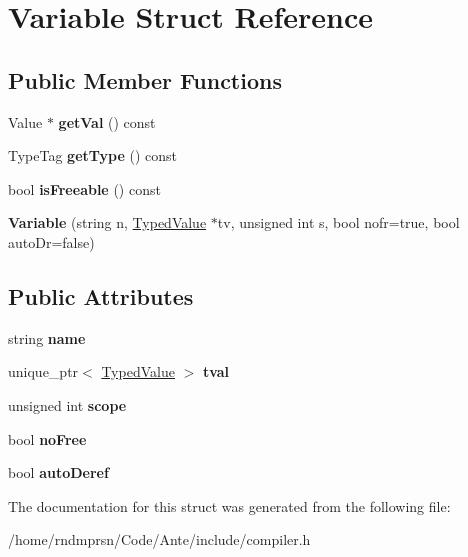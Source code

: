 \hypertarget{structVariable}{}\section{Variable Struct Reference}
\label{structVariable}
\subsection*{Public Member Functions}
\begin{DoxyCompactItemize}
\item 
\mbox{\label{structVariable_a164fedf4f2587fa45acca5bc2a8bad14}} 
Value $\ast$ {\bfseries get\+Val} () const
\item 
\mbox{\label{structVariable_a7dd2bdb587e4ea8f85d7c440592f7d5a}} 
Type\+Tag {\bfseries get\+Type} () const
\item 
\mbox{\label{structVariable_ac34f8cd9f40614d9ca9f7cfcabac1d45}} 
bool {\bfseries is\+Freeable} () const
\item 
\mbox{\label{structVariable_a5bc491642160a68df700245f37699544}} 
{\bfseries Variable} (string n, \hyperlink{structTypedValue}{Typed\+Value} $\ast$tv, unsigned int s, bool nofr=true, bool auto\+Dr=false)
\end{DoxyCompactItemize}
\subsection*{Public Attributes}
\begin{DoxyCompactItemize}
\item 
\mbox{\label{structVariable_a20d3268aae34f6b98d7dbdecb65b17ed}} 
string {\bfseries name}
\item 
\mbox{\label{structVariable_a9439f3ca39b88cd883c6edf022af2070}} 
unique\+\_\+ptr$<$ \hyperlink{structTypedValue}{Typed\+Value} $>$ {\bfseries tval}
\item 
\mbox{\label{structVariable_aa7c3d013ab972049fe353a4ebf68590c}} 
unsigned int {\bfseries scope}
\item 
\mbox{\label{structVariable_afc4ff8229d3dccf36951038fbd7feea5}} 
bool {\bfseries no\+Free}
\item 
\mbox{\label{structVariable_ad9b5732a05565d71f554eef748009296}} 
bool {\bfseries auto\+Deref}
\end{DoxyCompactItemize}


The documentation for this struct was generated from the following file\+:\begin{DoxyCompactItemize}
\item 
/home/rndmprsn/\+Code/\+Ante/include/compiler.\+h\end{DoxyCompactItemize}

